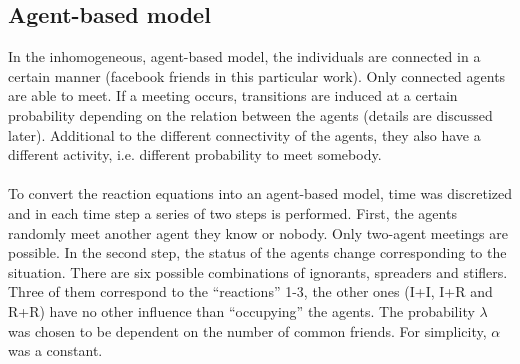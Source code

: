 \subsection{Agent-based model}

In the inhomogeneous, agent-based model, the individuals are connected in a certain manner (facebook friends in this particular work). Only connected agents are able to meet. If a meeting occurs, transitions are induced at a certain probability depending on the relation between the agents (details are discussed later). Additional to the different connectivity of the agents, they also have a different activity, i.e. different probability to meet somebody. 
\\
\\
To convert the reaction equations into an agent-based model, time was discretized
and in each time step a series of two steps is performed. First, the agents randomly meet another agent they know or nobody. Only two-agent meetings are possible. In the second step, the status of the agents change corresponding to the situation. There are six possible combinations of ignorants, spreaders and stiflers. Three of them correspond to the ``reactions'' 1-3, the other ones (I+I, I+R and R+R) have no other influence than ``occupying'' the agents. The probability $\lambda$ was chosen to be dependent on the number of common friends. For simplicity, $\alpha$ was a constant.